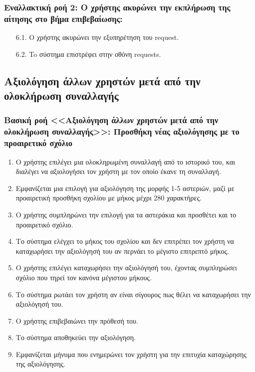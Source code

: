 \documentclass[12pt,a4paper]{article}
\begin{document}
\subsubsection*{Εναλλακτική ροή 2: Ο χρήστης ακυρώνει την εκπλήρωση της αίτησης στο βήμα επιβεβαίωσης:}
\begin{enumerate}
    \item [6.1.] Ο χρήστης ακυρώνει την εξυπηρέτηση του request.
    \item [6.2.] To σύστημα επιστρέφει στην οθόνη requests.
\end{enumerate}

\subsection{Αξιολόγηση άλλων χρηστών μετά από την ολοκλήρωση συναλλαγής}

\subsubsection*{Βασική ροή <<Αξιολόγηση άλλων χρηστών μετά από την ολοκλήρωση συναλλαγής>>: Προσθήκη νέας αξιολόγησης με το προαιρετικό σχόλιο}
\begin{enumerate}
    \item Ο χρήστης επιλέγει μια ολοκληρωμένη συναλλαγή από το ιστορικό του, και διαλέγει να αξιολογήσει τον χρήστη με τον οποίο έκανε τη συναλλαγή.
    \item Εμφανίζεται μια επιλογή για αξιολόγηση της μορφής 1-5 αστεριών, μαζί με προαιρετική προσθήκη σχολίου με μήκος μέχρι 280 χαρακτήρες.
    \item Ο χρήστης συμπληρώνει την επιλογή για τα αστεράκια και προσθέτει και το προαιρετικό σχόλιο.
    \item Το σύστημα ελέγχει το μήκος του σχολίου και δεν επιτρέπει τον χρήστη να καταχωρήσει την αξιολόγησή του αν περνάει το μέγιστο επιτρεπτό μήκος.
    \item Ο χρήστης επιλέγει καταχωρήσει την αξιολόγησή του, έχοντας συμπληρώσει σχόλιο που τηρεί τον κανόνα μέγιστου μήκους.
    \item Το σύστημα ρωτάει τον χρήστη αν είναι σίγουρος πως θέλει να καταχωρήσει την αξιολόγησή του.
    \item Ο χρήστης επιβεβαιώνει την πρόθεσή του.
    \item Το σύστημα αποθηκεύει την αξιολόγηση.
    \item Εμφανίζεται μήνυμα που ενημερώνει τον χρήστη για την επιτυχία καταχώρησης της αξιολόγησης.
\end{enumerate}
\end{document}
